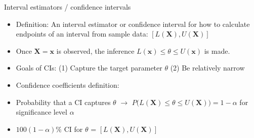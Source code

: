 \documentclass{article}
\begin{document}
Interval estimators / confidence intervals
\begin{itemize}
    \item Definition: An interval estimator or confidence interval for how to calculate endpoints of an interval from sample data: $[L(\mathbf{X}), U(\mathbf{X})]$
    \item[] Once $\mathbf{X} = \mathbf{x}$ is observed, the inference $L(\mathbf{x}) \le \theta \le U(\mathbf{x})$ is made.
    \item Goals of CIs: (1) Capture the target parameter $\theta$ (2) Be relatively narrow
    \item Confidence coefficients definition:
    \item[] Probability that a CI captures $\theta$ $\rightarrow$ $P\big(L(\mathbf{X}) \le \theta \le U(\mathbf{X})\big) = 1 - \alpha$ for significance level $\alpha$
    \item $100 (1 - \alpha)\%$ CI for $\theta$ = $[L(\mathbf{X}), U(\mathbf{X})]$   
\end{itemize}\bigskip
\end{document}
